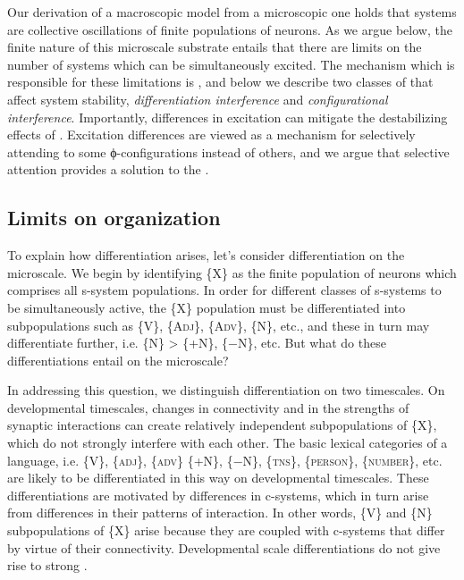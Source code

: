 Our derivation of a macroscopic model from a microscopic one holds that systems are collective oscillations of finite populations of neurons. As we argue below, the finite nature of this microscale substrate entails that there are limits on the number of  systems which can be simultaneously excited. The mechanism which is responsible for these limitations is , and below we describe two classes of  that affect system stability, \textit{differentiation interference} and \textit{configurational interference}. Importantly, differences in excitation can mitigate the destabilizing effects of . Excitation differences are viewed as a mechanism for selectively attending to some ϕ-con\-fig\-u\-ra\-tions instead of others, and we argue that selective attention provides a solution to the .

\subsection{Limits on organization}

To explain how differentiation  arises, let's consider differentiation on the microscale. We begin by identifying \{X\} as the finite population of neurons which comprises all s-system populations. In order for different classes of s-systems to be simultaneously active, the \{X\} population must be differentiated into subpopulations such as \{V\}, \{A\textsc{dj}\}, \{A\textsc{dv}\}, \{N\}, etc., and these in turn may differentiate further, i.e. \{N\} > \{+N\}, \{−N\}, etc. But what do these differentiations entail on the microscale?

  In addressing this question, we distinguish differentiation on two timescales. On developmental timescales, changes in connectivity and in the strengths of synaptic interactions can create relatively independent subpopulations of \{X\}, which do not strongly interfere with each other. The basic lexical categories of a language, i.e. \{V\}, \{\textsc{adj}\}, \{\textsc{adv}\} \{+N\}, \{−N\}, \{\textsc{tns}\}, \{\textsc{person}\}, \{\textsc{number}\}, etc. are likely to be differentiated in this way on developmental timescales. These differentiations are motivated by differences in c-systems, which in turn arise from differences in their patterns of  interaction. In other words, \{V\} and \{N\} subpopulations of \{X\} arise because they are coupled with c-systems that differ by virtue of their  connectivity. Developmental scale differentiations do not give rise to strong .

